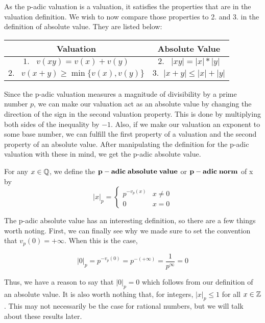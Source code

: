 \documentclass[a4paper]{article}
\begin{document}
As the p-adic valuation is a valuation, it satisfies the properties that
are in the valuation definition.  We wish to now compare those properties
to 2. and 3. in the definition of 
absolute value. They are listed below:

\begin{center}
  \begin{tabular}{|c|c|}
    \hline
      Valuation & Absolute Value\\
    \hline
      $1.\;\;\;v(xy)=v(x)+v(y)$ & $2.\;\;\;|xy|=|x|*|y|$\\
      $2.\;\;\;v(x+y)\geq\min\{v(x),v(y)\}$ & $3.\;\;|x+y|\leq |x|+|y|$\\
    \hline
  \end{tabular}
\end{center}

Since the p-adic valuation measures a magnitude of
divisibility by a prime number $p$, we can make our valuation act as
an absolute value by changing the direction of the sign in the second
valuation property.  This is done by multiplying both sides of the
inequality by $-1$. Also, if we make our valuation an exponent to some base
number, we can fulfill the first property of a valuation and the second
property of an absolute value.  After manipulating the definition
for the p-adic valuation with these in mind, we get the p-adic
absolute value.

\begin{definition}
  For any \(x\in\mathbb Q\), we define the $\bf{p-adic\;absolute\;value}$
  or $\bf{p-adic\;norm}$ of x by
  \[
  	|x|_p=
    \begin{cases}
      p^{-v_p(x)} & x\neq 0\\
      0 & x=0
    \end{cases}
  \]
\end{definition}

The p-adic absolute value has an interesting definition, so there
are a few things worth noting.  First, we can finally see why we
made sure to set the convention that \(v_p(0)=+\infty\).  When
this is the case, 

\[
	|0|_p=p^{-v_p(0)}=p^{-(+\infty)}=\frac{1}{p^\infty}=0
\]

Thus, we have a reason to say that \(|0|_p=0\) which follows from our 
definition of an absolute value.  It is also worth 
nothing that, for integers, \(|x|_p\leq1\) for all $x\in\mathbb Z$. 
This may not necessarily be the case for rational numbers, but we
will talk about these results later.
\end{document}
